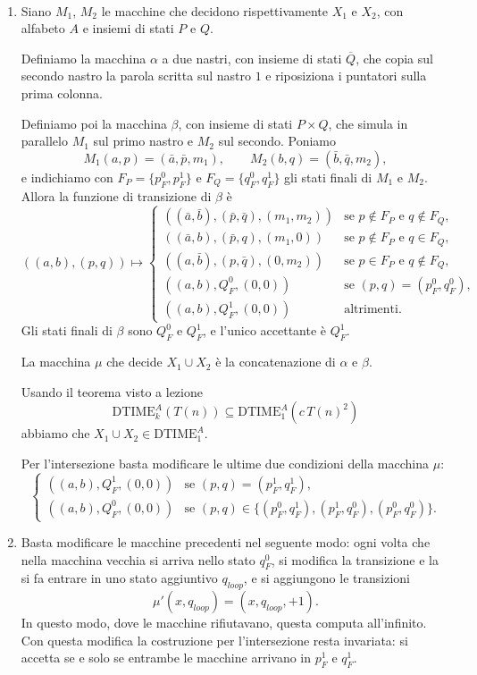 \begin{sol}\
\begin{enumerate}
    \item Siano $M_1$, $M_2$ le macchine che decidono rispettivamente $X_1$ e $X_2$, con alfabeto $A$ e insiemi di stati $P$ e $Q$.

    Definiamo la macchina $\alpha$ a due nastri, con insieme di stati $\overline{Q}$, che copia sul secondo nastro la parola scritta sul nastro $1$ e riposiziona i puntatori sulla prima colonna.

    Definiamo poi la macchina $\beta$, con insieme di stati $P\times Q$, che simula in parallelo $M_1$ sul primo nastro e $M_2$ sul secondo. Poniamo
    \[
    M_1(a,p)=(\bar a,\bar p,m_1),\qquad M_2(b,q)=(\bar b,\bar q,m_2),
    \]
    e indichiamo con $F_P=\{p_F^0,p_F^1\}$ e $F_Q=\{q_F^0,q_F^1\}$ gli stati finali di $M_1$ e $M_2$. Allora la funzione di transizione di $\beta$ è
    \[
    ((a,b),(p,q))\longmapsto
    \begin{cases}
    ((\bar a,\bar b),(\bar p,\bar q),(m_1,m_2)) & \text{se } p\notin F_P \text{ e } q\notin F_Q,\\
    ((\bar a,b),(\bar p,q),(m_1,0)) & \text{se } p\notin F_P \text{ e } q\in F_Q,\\
    ((a,\bar b),(p,\bar q),(0,m_2)) & \text{se } p\in F_P \text{ e } q\notin F_Q,\\
    ((a,b),Q_F^0,(0,0)) & \text{se } (p,q)=(p_F^0,q_F^0),\\
    ((a,b),Q_F^1,(0,0)) & \text{altrimenti.}
    \end{cases}
    \]
    Gli stati finali di $\beta$ sono $Q_F^0$ e $Q_F^1$, e l'unico accettante è $Q_F^1$.

    La macchina $\mu$ che decide $X_1\cup X_2$ è la concatenazione di $\alpha$ e $\beta$.

    Usando il teorema visto a lezione
    \[
    \mathrm{DTIME}_k^A(T(n))\subseteq \mathrm{DTIME}_1^A(c\,T(n)^2)
    \]
    abbiamo che $X_1\cup X_2\in\mathrm{DTIME}_1^A$.

    Per l'intersezione basta modificare le ultime due condizioni della macchina $\mu$:
    \[
    \begin{cases}
    ((a,b),Q_F^1,(0,0)) & \text{se } (p,q)=(p_F^1,q_F^1),\\
    ((a,b),Q_F^0,(0,0)) & \text{se } (p,q)\in\{(p_F^0,q_F^1),(p_F^1,q_F^0),(p_F^0,q_F^0)\}.
    \end{cases}
    \]

    \item Basta modificare le macchine precedenti nel seguente modo: ogni volta che nella macchina vecchia si arriva nello stato $q_F^0$, si modifica la transizione e la si fa entrare in uno stato aggiuntivo $q_{loop}$, e si aggiungono le transizioni
    \[
    \mu'(x,q_{loop})=(x,q_{loop},+1).
    \]
    In questo modo, dove le macchine rifiutavano, questa computa all'infinito. Con questa modifica la costruzione per l'intersezione resta invariata: si accetta se e solo se entrambe le macchine arrivano in $p_F^1$ e $q_F^1$.


\end{enumerate}
\end{sol}
